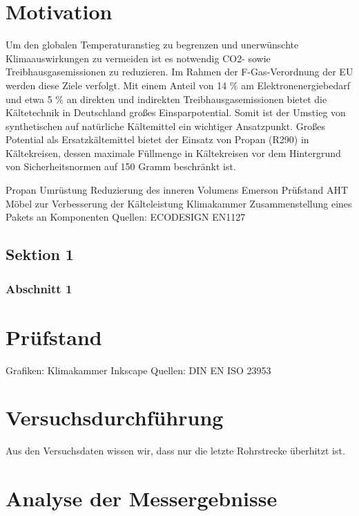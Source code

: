 \chapter{Motivation}
\label{cha:Motivation}

Um den globalen Temperaturanstieg zu begrenzen und unerwünschte Klimaauswirkungen zu vermeiden ist es notwendig CO2- sowie Treibhausgasemissionen zu reduzieren. Im Rahmen der F-Gas-Verordnung der EU werden diese Ziele verfolgt. Mit einem Anteil von 14 \%  am Elektronenergiebedarf und etwa 5 \% an direkten und indirekten Treibhausgasemissionen bietet die Kältetechnik in Deutschland großes Einsparpotential. Somit ist der Umstieg von synthetischen auf natürliche Kältemittel ein wichtiger Ansatzpunkt. 
Großes Potential als Ersatzkältemittel bietet der Einsatz von Propan (R290) in Kältekreisen, dessen maximale Füllmenge in Kältekreisen vor dem Hintergrund von Sicherheitsnormen auf 150 Gramm beschränkt ist. 

Propan Umrüstung
Reduzierung des inneren Volumens
Emerson Prüfstand AHT Möbel zur Verbesserung der Kälteleistung
Klimakammer
Zusammenstellung eines Pakets an Komponenten
Quellen:
ECODESIGN
EN1127







\section{Sektion 1}
\label{sec:Sektion 1}

\subsection{Abschnitt 1}
\label{subsec:Abschnitt1}


\chapter{Prüfstand}
\label{cha:Prüfstand}


Grafiken:
Klimakammer Inkscape
Quellen:
DIN EN ISO 23953

\chapter{Versuchsdurchführung}
\label{cha:Versuchsdurchführung}

Aus den Versuchsdaten wissen wir, dass nur die letzte Rohrstrecke überhitzt ist.

\chapter{Analyse der Messergebnisse}
\label{cha:Analyse der Messergebnisse}

